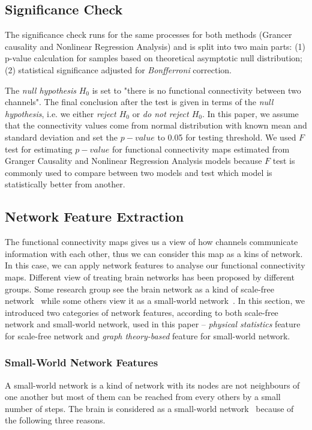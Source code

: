 \subsection{Significance Check}
The significance check runs for the same processes for both methods (Grancer causality and Nonlinear Regression Analysis) and is split into two main parts: (1) p-value calculation for samples based on theoretical asymptotic null distribution; (2) statistical significance adjusted for \emph{Bonfferroni} correction.

The \emph{null hypothesis} $H_0$ is set to "there is no functional connectivity between two channels". The final conclusion after the test is given in terms of the \emph{null hypothesis}, i.e. we either \emph{reject $H_0$} or \emph{do not reject $H_0$}. In this paper, we assume that the connectivity values come from normal distribution with known mean and standard deviation and set the $p-value$ to 0.05 for testing threshold. We used $F$ test for estimating $p-value$ for functional connectivity maps estimated from Granger Causality and Nonlinear Regression Analysis models because $F$ test is commonly used to compare between two models and test which model is statistically better from another.

\subsection{Network Feature Extraction}
The functional connectivity maps gives us a view of how channels communicate information with each other, thus we can consider this map as a kins of network. In this case, we can apply network features to analyse our functional connectivity maps. Different view of treating brain networks has been proposed by different groups. Some research group see the brain network as a kind of scale-free network~\cite{eguiluz2005scale} while some others view it as a small-world network~\cite{bassett2006small}. In this section, we introduced two categories of network features, according to both scale-free network and small-world network, used in this paper -- \emph{physical statistics} feature for scale-free network and \emph{graph theory-based} feature for small-world network.

\subsubsection{Small-World Network Features}
A small-world network is a kind of network with its nodes are not neighbours of one another but most of them can be reached from every others by a small number of steps. The brain is considered as a small-world network~\cite{bassett2006small} because of the  following three reasons.

